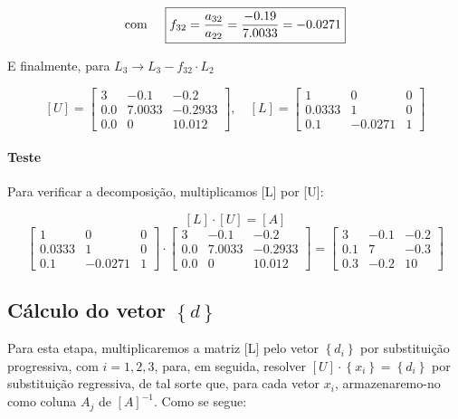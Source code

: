 \documentclass[12pt]{article}
\begin{document}
\[
\text{com} \hspace{0.5cm} \boxed{f_{32} = \frac{a_{32}}{a_{22}} = \frac{-0.19}{7.0033} = -0.0271}
\]

E finalmente, para \(L_{3}\rightarrow L_{3} - f_{32} \cdot L_{2}\)

\[
  [U] = \begin{bmatrix}
    3 & -0.1 & -0.2 \\
    0.0 & 7.0033 & -0.2933 \\
    0.0 & 0 & 10.012
  \end{bmatrix}, \quad
  [L] = \begin{bmatrix}
    1 & 0 & 0 \\
    0.0333 & 1 & 0 \\
    0.1 & -0.0271 & 1
  \end{bmatrix}
\]

\paragraph{Teste} Para verificar a decomposição, multiplicamos [L] por [U]:

\[
[L]\cdot[U] = [A]
\]
\[
\begin{bmatrix}
    1 & 0 & 0 \\
    0.0333 & 1 & 0 \\
    0.1 & -0.0271 & 1
  \end{bmatrix}
\cdot
\begin{bmatrix}
    3 & -0.1 & -0.2 \\
    0.0 & 7.0033 & -0.2933 \\
    0.0 & 0 & 10.012
  \end{bmatrix} =
\begin{bmatrix}
    3 & -0.1 & -0.2 \\
    0.1 & 7 & -0.3 \\
    0.3 & -0.2 & 10
  \end{bmatrix}
\]

\subsection{\texorpdfstring{Cálculo do vetor $\left\{d\right\}$}{Cálculo do vetor d}}

Para esta etapa, multiplicaremos a matriz [L] pelo vetor \(\left\{d_{i}\right\}\) por substituição progressiva, com \(i=1, 2, 3\), para, em seguida, resolver \([U]\cdot \left\{x_{i}\right\}=\left\{d_i\right\}\) por substituição regressiva, de tal sorte que, para cada vetor \(x_{i}\), armazenaremo-no como coluna \(A_j\) de $[A]^{-1}$. Como se segue:
\end{document}
